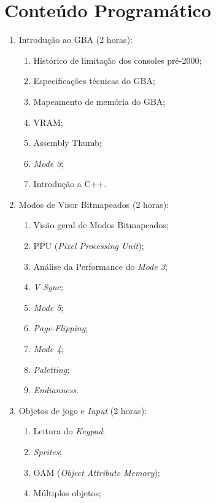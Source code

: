 \documentclass{article}
\begin{document}
\section{Conteúdo Programático}

\begin{enumerate}
    \item Introdução ao GBA (2 horas):
        \begin{enumerate}
                \item Histórico de limitação dos consoles pré-2000;
                \item Especificações técnicas do GBA;
                \item Mapeamento de memória do GBA;
                \item VRAM;
                \item Assembly Thumb;
                \item \textit{Mode 3};
                \item Introdução a C++.
        \end{enumerate}
    \item Modos de Visor Bitmapeados (2 horas):
        \begin{enumerate}
                \item Visão geral de Modos Bitmapeados;
                \item PPU (\textit{Pixel Processing Unit});
                \item Análise da Performance do \textit{Mode 3};
                \item \textit{V-Sync};
                \item \textit{Mode 5};
                \item \textit{Page-Flipping};
                \item \textit{Mode 4};
                \item \textit{Paletting};
                \item \textit{Endianness}.
        \end{enumerate}
    \item Objetos de jogo e \textit{Input} (2 horas):
        \begin{enumerate}
                \item Leitura do \textit{Keypad};
                \item \textit{Sprites};
                \item OAM (\textit{Object Attribute Memory});
                \item Múltiplos objetos;

\end{enumerate}
\end{enumerate}
\end{document}

